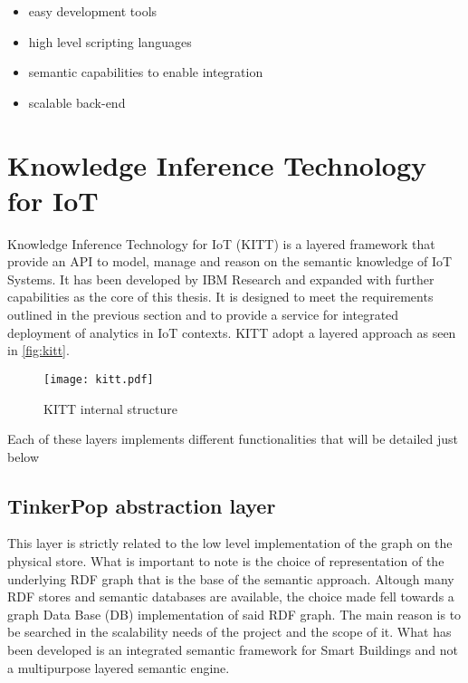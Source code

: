 \begin{itemize}
  \item easy development tools
  \item high level scripting languages
  \item semantic capabilities to enable integration
  \item scalable back-end
\end{itemize}

\section{Knowledge Inference Technology for IoT}
Knowledge Inference Technology for IoT (KITT) is a layered framework that provide an API to model, manage and reason on the semantic knowledge of IoT Systems. It has been developed by IBM Research and expanded with further capabilities as the core of this thesis. It is designed to meet the requirements outlined in the previous section and to provide a service for integrated deployment of analytics in IoT contexts.
KITT adopt a layered approach as seen in \autoref{fig:kitt}.
\begin{figure}
  \centering
  \texttt{[image: kitt.pdf]}
  \caption{KITT internal structure}
  \label{fig:kitt}
\end{figure}
Each of these layers implements different functionalities that will be detailed just below

\subsection{TinkerPop abstraction layer}
This layer is strictly related to the low level implementation of the graph on the physical store. What is important to note is the choice of representation of the underlying RDF graph that is the base of the semantic approach. Altough many RDF stores and semantic databases are available, the choice made fell towards a graph Data Base (DB) implementation of said RDF graph. The main reason is to be searched in the scalability needs of the project and the scope of it. What has been developed is an integrated semantic framework for Smart Buildings and not a multipurpose layered semantic engine.
